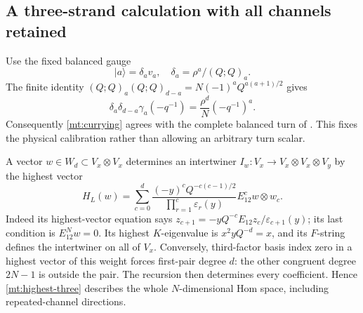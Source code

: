 \documentclass[11pt]{article}
\numberwithin{equation}{section}
\theoremstyle{definition}\newtheorem{definition}[theorem]{Definition}
\theoremstyle{remark}\newtheorem{remark}[theorem]{Remark}
\begin{document}
\subsection{A three-strand calculation with all channels retained}
Use the fixed balanced gauge
\[
 |a\rangle=\delta_av_a,\quad
 \delta_a=\rho^a/(Q;Q)_a.
\]
The finite identity
$(Q;Q)_a(Q;Q)_{d-a}=N(-1)^aQ^{a(a+1)/2}$ gives
\[
 \delta_a\delta_{d-a}\gamma_a(-q^{-1})
       =\frac{\rho^d}{N}(-q^{-1})^a.
\]
Consequently \eqref{mt:currying} agrees with the complete balanced
turn of \cite[Proposition~3.2]{Newton}. This fixes the physical
calibration rather than allowing an arbitrary turn scalar.

A vector $w\in W_d\subset V_x\otimes V_x$ determines an intertwiner
$I_w:V_x\to V_x\otimes V_x\otimes V_y$ by the highest vector
\begin{equation}\label{mt:highest-three}
 H_L(w)=\sum_{c=0}^d
 \frac{(-y)^cQ^{-c(c-1)/2}}{\prod_{r=1}^c\varepsilon_r(y)}
             E_{12}^cw\otimes w_c.
\end{equation}
Indeed its highest-vector equation says
$z_{c+1}=-yQ^{-c}E_{12}z_c/\varepsilon_{c+1}(y)$; its last
condition is $E_{12}^Nw=0$. Its highest $K$-eigenvalue is
$x^2yQ^{-d}=x$, and its $F$-string defines the intertwiner on all
of $V_x$. Conversely, third-factor basis index zero in a highest vector of this
weight forces first-pair degree $d$: the other congruent degree
$2N-1$ is outside the pair. The recursion then determines every
coefficient. Hence \eqref{mt:highest-three} describes the whole
$N$-dimensional Hom space, including repeated-channel directions.
\end{document}
